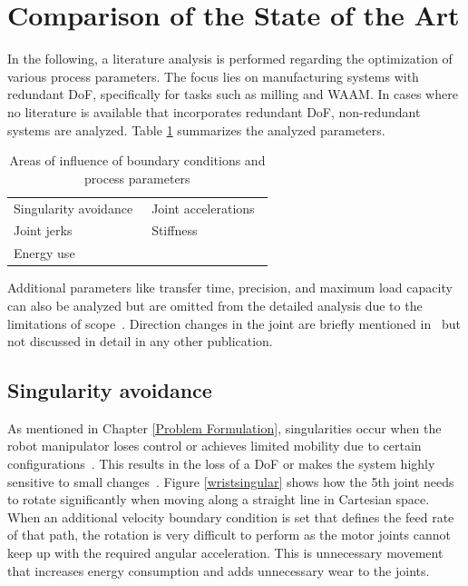\section{Comparison of the State of the Art }%

In the following, a literature analysis is performed regarding the optimization of various process parameters. The focus lies on manufacturing systems with redundant DoF, specifically for tasks such as milling and WAAM. In cases where no literature is available that incorporates redundant DoF, non-redundant systems are analyzed.
Table \ref{parameter} summarizes the analyzed parameters. 


\begin{table} [H]
	\centering
	\begin{tabular}{|l|l|}
		\hline
		\hline
		Singularity avoidance~\cite{Huo.2008} & Joint accelerations~\cite{Gasparetto.2010}\\
		Joint jerks~\cite{Gasparetto.2010} & Stiffness~\cite{Cvitanic.2020} \\
		Energy use~\cite{Paryanto.2015} & \\
		\hline
		\hline
		
	\end{tabular}
	
	
	\caption{Areas of influence of boundary conditions and process parameters}
	\label{parameter}
\end{table}

Additional parameters like transfer time, precision, and maximum load capacity can also be analyzed but are omitted from the detailed analysis due to the limitations of scope~\cite{Breaz.2017, Hirzinger.2005, Pham.2018}. Direction changes in the joint are briefly mentioned in~\cite{Halbauer.2013} but not discussed in detail in any other publication.

\subsection{Singularity avoidance}\label{Singularity avoidance}
As mentioned in Chapter \ref{Problem Formulation}, singularities occur when the robot manipulator loses control or achieves limited mobility due to certain configurations~\cite{Malyshev.2022}. This results in the loss of a DoF or makes the system highly sensitive to small changes~\cite{Zhao.2021, Milenkovic.2021}.
Figure \ref{wristsingular} shows how the 5th joint needs to rotate significantly when moving along a straight line in Cartesian space. When an additional velocity boundary condition is set that defines the feed rate of that path, the rotation is very difficult to perform as the motor joints cannot keep up with the required angular acceleration. This is unnecessary movement that increases energy consumption and adds unnecessary wear to the joints. 



